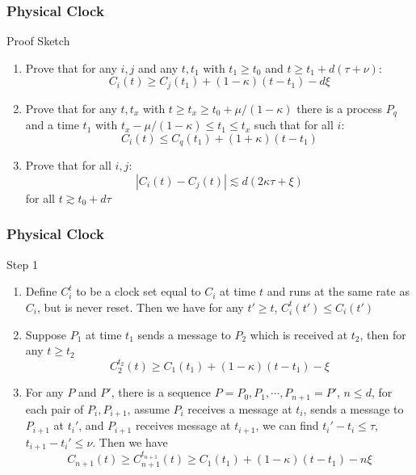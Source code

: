 \documentclass{beamer}
\begin{document}
\frame
{
  \frametitle{Physical Clock}
  \begin{block}{Proof Sketch}
  \begin{enumerate}
  	\item<2-> Prove that for any $i,j$ and any $t,t_1$ with $t_1\geq t_0$ and $t\geq t_1+d(\tau+\nu)$:
  	\[C_i(t)\geq C_j(t_1)+(1-\kappa)(t-t_1)-d\xi\]
  	\item<3-> Prove that for any $t,t_x$ with $t\geq t_x\geq t_0+\mu/(1-\kappa)$ there is a process $P_q$ and a time $t_1$ with $t_x-\mu/(1-\kappa)\leq t_1\leq t_x$ such that for all $i$:
  	\[C_i(t)\leq C_q(t_1)+(1+\kappa)(t-t_1)\]
  	\item<4-> Prove that for all $i,j$:
  	\[|C_i(t)-C_j(t)|\lesssim d(2\kappa\tau+\xi)\]
  	for all $t\gtrsim t_0+d\tau$
  \end{enumerate}
  \end{block}
}

\frame
{
  \frametitle{Physical Clock}
  \begin{block}{Step 1}
  \begin{enumerate}
  	\item<1-> Define $C_i^t$ to be a clock set equal to $C_i$ at time $t$ and runs at the same rate as $C_i$, but is never reset. Then we have for any $t'\geq t$, $C_i^t(t')\leq C_i(t')$
  	\item<2-> Suppose $P_1$ at time $t_1$ sends a message to $P_2$ which is received at $t_2$, then for any $t\geq t_2$
  	\[C_2^{t_2}(t)\geq C_1(t_1)+(1-\kappa)(t-t_1)-\xi\]
  	\item<3-> For any $P$ and $P'$, there is a sequence $P=P_0,P_1,\cdots,P_{n+1}=P'$, $n\leq d$, for each pair of $P_i,P_{i+1}$, assume $P_i$ receives a message at $t_i$, sends a message to $P_{i+1}$ at $t_i'$, and $P_{i+1}$ receives message at $t_{i+1}$, we can find $t_i'-t_i\leq\tau$, $t_{i+1}-t_i'\leq\nu$. Then we have
  	\[C_{n+1}(t)\geq C_{n+1}^{t_{n+1}}(t) \geq C_1(t_1)+(1-\kappa)(t-t_1)-n\xi\]
  \end{enumerate}
  \end{block}
}
\end{document}
